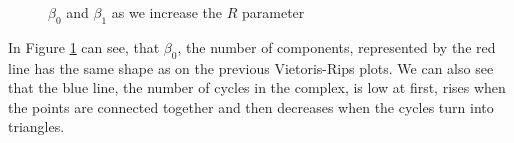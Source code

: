 \documentclass[a4paper, 12pt]{article}
\begin{document}
\begin{figure}[H]
        \centering
        \caption{$\beta_0$ and $\beta_1$ as we increase the $R$ parameter}
        \label{plot-cech}
\end{figure}
In Figure \ref{plot-cech} can see, that $\beta_0$, the number of components, represented by the red line has the same shape as on the previous Vietoris-Rips plots. We can also see that the blue line, the number of cycles in the complex, is low at first, rises when the points are connected together and then decreases when the cycles turn into triangles. 
\end{document}
